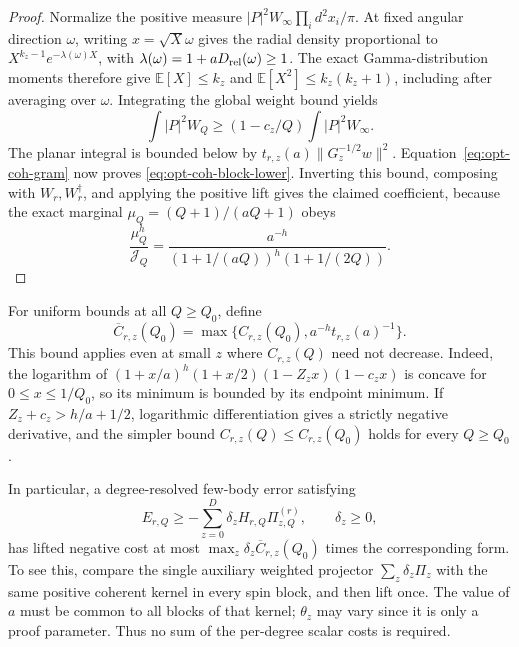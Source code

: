 \begin{proof}
Normalize the positive measure $|P|^2W_\infty\prod_i d^2x_i/\pi$.
At fixed angular direction $\omega$, writing $x=\sqrt X\omega$ gives
the radial density proportional to
$X^{k_z-1}e^{-\lambda(\omega)X}$, with
$\lambda(\omega)=1+aD_{\rm rel}(\omega)\ge1$.
The exact Gamma-distribution moments therefore give
$\mathbb E[X]\le k_z$ and $\mathbb E[X^2]\le k_z(k_z+1)$,
including after averaging over $\omega$.
Integrating the global weight bound yields
\begin{equation}
 \int|P|^2W_Q\ge(1-c_z/Q)\int|P|^2W_\infty.
\end{equation}
The planar integral is bounded below by
$t_{r,z}(a)\|G_z^{-1/2}w\|^2$.
Equation~\eqref{eq:opt-coh-gram} now proves
\eqref{eq:opt-coh-block-lower}. Inverting this bound, composing with
$W_r,W_r^\dagger$, and applying the positive lift gives the claimed
coefficient, because the exact marginal $\mu_Q=(Q+1)/(aQ+1)$ obeys
\begin{equation}
 \frac{\mu_Q^h}{\mathcal J_Q}
 =\frac{a^{-h}}{(1+1/(aQ))^h(1+1/(2Q))}.
\end{equation}
\end{proof}

For uniform bounds at all $Q\ge Q_0$, define
\begin{equation}\label{eq:opt-coh-uniform}
 \overline C_{r,z}(Q_0)=
 \max\{C_{r,z}(Q_0),a^{-h}t_{r,z}(a)^{-1}\}.
\end{equation}
This bound applies even at small $z$ where $C_{r,z}(Q)$ need not decrease.
Indeed, the logarithm of
$(1+x/a)^h(1+x/2)(1-Z_zx)(1-c_zx)$ is concave for
$0\le x\le1/Q_0$, so its minimum is bounded by its endpoint minimum.
If $Z_z+c_z>h/a+1/2$, logarithmic differentiation gives a strictly
negative derivative, and the simpler bound $C_{r,z}(Q)\le C_{r,z}(Q_0)$
holds for every $Q\ge Q_0$.

In particular, a degree-resolved few-body error satisfying
\begin{equation}
 E_{r,Q}\ge-\sum_{z=0}^D\delta_zH_{r,Q}\Pi^{(r)}_{z,Q},
 \qquad\delta_z\ge0,
\end{equation}
has lifted negative cost at most
$\max_z\delta_z\overline C_{r,z}(Q_0)$ times the corresponding form.
To see this, compare the single auxiliary weighted projector
$\sum_z\delta_z\Pi_z$ with the same positive coherent kernel in every
spin block, and then lift once. The value of $a$ must be common to all
blocks of that kernel; $\theta_z$ may vary since it is only a proof
parameter. Thus no sum of the per-degree scalar costs is required.

